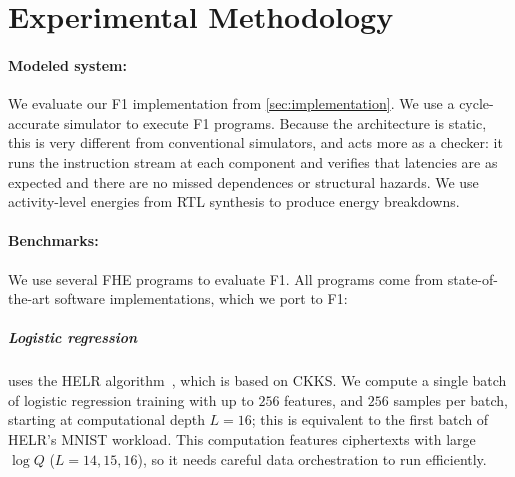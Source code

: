 


\section{Experimental Methodology}
\label{sec:f1methodology}

\paragraph{Modeled system:}
We evaluate our F1 implementation from \autoref{sec:implementation}.
We use a cycle-accurate simulator to execute F1 programs.
Because the architecture is static, this is very different from conventional simulators,
and acts more as a checker: it runs the instruction stream at each component and verifies
that latencies are as expected and there are no missed dependences or structural hazards.
We use activity-level energies from RTL synthesis to produce energy breakdowns.

\paragraph{Benchmarks:}
We use several FHE programs to evaluate F1. %
All programs come from state-of-the-art software implementations, which we port to F1:

\subparagraph{Logistic regression}
uses the HELR algorithm~\cite{han:aaai19:logistic}, which is based on CKKS.
We compute a single batch of logistic regression training with up to $256$ features, and $256$ samples per batch,
starting at computational depth $L = 16$; this is equivalent to the first batch of HELR's MNIST workload. 
This computation features %
ciphertexts with large $\log Q$ ($L = 14,15,16$), so it needs careful data orchestration to run efficiently.

